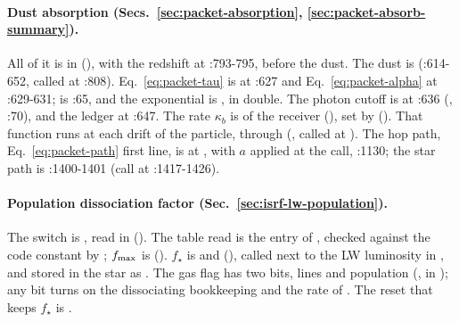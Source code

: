 \paragraph{Dust absorption (Secs.~\ref{sec:packet-absorption}, \ref{sec:packet-absorb-summary}).} All of it is
in  (), with
the redshift at :793-795, before the dust. The dust is
 (:614-652, called at :808).
Eq.~\eqref{eq:packet-tau} is at :627 and Eq.~\eqref{eq:packet-alpha} at
:629-631;  is :65, and the
exponential is , in double. The photon cutoff is at :636
(, :70), and the ledger at :647. The rate
$\kappa_b$ is  of the receiver
(), set by
 ().
That function runs at each drift of the particle, through
 (,
called at ).
The hop path, Eq.~\eqref{eq:packet-path} first line, is at
, with $a$ applied at the call, :1130; the star
path is :1400-1401 (call at :1417-1426).

\paragraph{Population dissociation factor (Sec.~\ref{sec:isrf-lw-population}).}
The switch is , read in
 (). The table read
is the  entry of ,
checked against the code constant by
; $f_{\rm max}$ is
(). $f_\star$ is
 and
(), called next to the LW luminosity in
, and stored in the star as
. The gas flag has two bits, lines and
population (,
 in
); any bit turns on the
dissociating bookkeeping and the rate of
.
The reset that keeps $f_\star$ is
.


